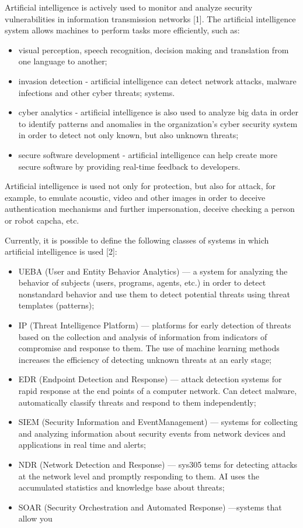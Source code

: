 \documentclass[10pt, a4paper]{proc}
\begin{document}
Artificial intelligence is actively used to monitor and
analyze security vulnerabilities in information transmission networks [1]. The artificial intelligence system allows
machines to perform tasks more efficiently, such as:
\begin{itemize}[noitemsep]
    \item visual perception, speech recognition, decision making and translation from one language to another;
    \item invasion detection - artificial intelligence can detect
network attacks, malware infections and other cyber
threats;
systems.
     \item cyber analytics - artificial intelligence is also used
to analyze big data in order to identify patterns and
anomalies in the organization’s cyber security system
in order to detect not only known, but also unknown
threats;
    \item secure software development - artificial intelligence
can help create more secure software by providing
real-time feedback to developers.

\end{itemize}
Artificial intelligence is used not only for protection,
but also for attack, for example, to emulate acoustic,
video and other images in order to deceive authentication
mechanisms and further impersonation, deceive checking
a person or robot capcha, etc.

Currently, it is possible to define the following classes
of systems in which artificial intelligence is used [2]:
\begin{itemize}[noitemsep]
    \item UEBA (User and Entity Behavior Analytics) —
a system for analyzing the behavior of subjects
(users, programs, agents, etc.) in order to detect nonstandard behavior and use them to detect potential
threats using threat templates (patterns);

    \item IP (Threat Intelligence Platform) — platforms for
early detection of threats based on the collection
and analysis of information from indicators of
compromise and response to them. The use of
machine learning methods increases the efficiency
of detecting unknown threats at an early stage;

    \item EDR (Endpoint Detection and Response) — attack
detection systems for rapid response at the end
points of a computer network. Can detect malware,
automatically classify threats and respond to them
independently;
    \item SIEM (Security Information and EventManagement)
— systems for collecting and analyzing information
about security events from network devices and
applications in real time and alerts;
    \item NDR (Network Detection and Response) — sys305
tems for detecting attacks at the network level
and promptly responding to them. AI uses the
accumulated statistics and knowledge base about
threats;
   \item  SOAR (Security Orchestration and Automated Response) —systems that allow you 

\end{itemize}
 
\end{document}
